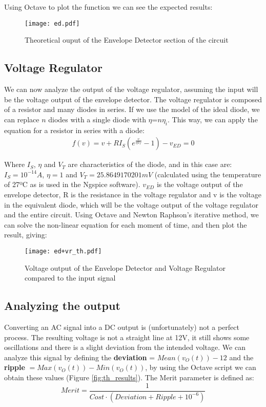 Using Octave to plot the function we can see the expected results:

\begin{figure}[h]
	\centering
	\texttt{[image: ed.pdf]}
	\caption{Theoretical ouput of the Envelope Detector section of the circuit}
	\label{fig:envelope}
\end{figure}

\newpage

\subsection{Voltage Regulator}
\hspace{12pt} We can now analyze the output of the voltage regulator, assuming the input will be the voltage output of the envelope detector. The voltage regulator is composed of a resistor and many diodes in series. If we use the model of the ideal diode, we can replace $n$ diodes with a single diode with $\eta$=$n\eta _i$. This way, we can apply the equation for a resistor in series with a diode:
\vspace{-8pt}
\begin{gather}
    f(v)=v+RI_S(e^{\frac{v}{\eta V_T}}-1)-v_{ED}=0 \nonumber
\end{gather}

Where $I_S$, $\eta$ and $V_T$ are characteristics of the diode, and in this case are: $I_S = 10^{-14}A$, $\eta = 1$ and $V_T = 25.8649170201mV$ (calculated using the temperature of 27ºC as is used in the Ngspice software). $v_{ED}$ is the voltage output of the envelope detector, R is the resistance in the voltage regulator and v is the voltage in the equivalent diode, which will be the voltage output of the voltage regulator and the entire circuit.
Using Octave and Newton Raphson's iterative method, we can solve the non-linear equation for each moment of time, and then plot the result, giving:

\begin{figure}[h]
	\centering
	\texttt{[image: ed+vr\_th.pdf]}
	\caption{Voltage output of the Envelope Detector and Voltage Regulator compared to the input signal}
	\label{fig:regulator}
\end{figure}

\subsection{Analyzing the output}
\hspace{12pt} Converting an AC signal into a DC output is (unfortunately) not a perfect process. The resulting voltage is not a straight line at 12V, it still shows some oscillations and there is a slight deviation from the intended voltage. We can analyze this signal by defining the \textbf{deviation} = $Mean(v_O(t)) - 12$ and the \textbf{ripple} $= Max(v_O(t)) - Min(v_O(t))$, by using the Octave script we can obtain these values (Figure \ref{fig:th_results}). The Merit parameter is defined as:
\begin{equation}
	Merit = \frac{1}{Cost \cdot(Deviation + Ripple + 10^{-6})}
\end{equation}

